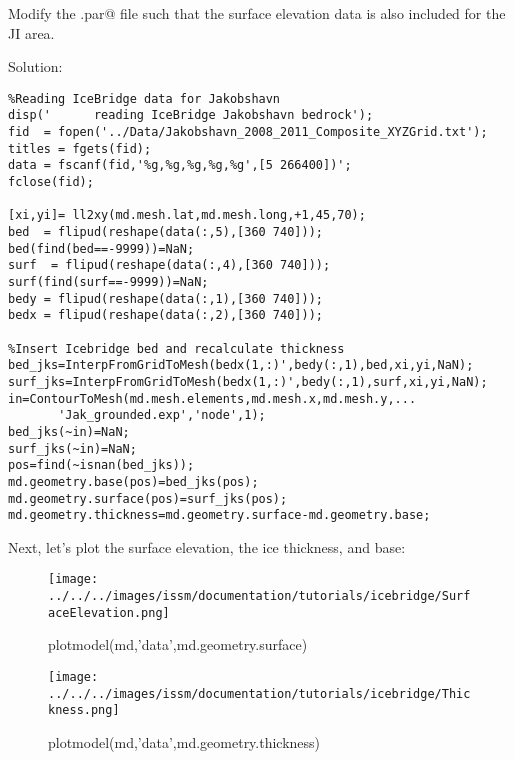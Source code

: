 Modify the \verb@Greenland.par@ file such that the surface elevation data is also included for the JI area.

\vspace{5cm}

Solution:
\begin{verbatim}%Reading IceBridge data for Jakobshavn
disp('      reading IceBridge Jakobshavn bedrock');
fid  = fopen('../Data/Jakobshavn_2008_2011_Composite_XYZGrid.txt');
titles = fgets(fid); 
data = fscanf(fid,'%g,%g,%g,%g,%g',[5 266400])';
fclose(fid);

[xi,yi]= ll2xy(md.mesh.lat,md.mesh.long,+1,45,70);
bed  = flipud(reshape(data(:,5),[360 740])); bed(find(bed==-9999))=NaN;
surf  = flipud(reshape(data(:,4),[360 740])); surf(find(surf==-9999))=NaN;
bedy = flipud(reshape(data(:,1),[360 740]));
bedx = flipud(reshape(data(:,2),[360 740]));

%Insert Icebridge bed and recalculate thickness
bed_jks=InterpFromGridToMesh(bedx(1,:)',bedy(:,1),bed,xi,yi,NaN);
surf_jks=InterpFromGridToMesh(bedx(1,:)',bedy(:,1),surf,xi,yi,NaN);
in=ContourToMesh(md.mesh.elements,md.mesh.x,md.mesh.y,...
	   'Jak_grounded.exp','node',1);
bed_jks(~in)=NaN;
surf_jks(~in)=NaN;
pos=find(~isnan(bed_jks));
md.geometry.base(pos)=bed_jks(pos);
md.geometry.surface(pos)=surf_jks(pos);
md.geometry.thickness=md.geometry.surface-md.geometry.base;\end{verbatim}

Next, let's plot the surface elevation, the ice thickness, and base:
\begin{figure}[H]
	\begin{center}
	\texttt{[image: ../../../images/issm/documentation/tutorials/icebridge/SurfaceElevation.png]}
	\caption{plotmodel(md,'data',md.geometry.surface)}
	\end{center}
\end{figure}

\begin{figure}[H]
	\begin{center}
	\texttt{[image: ../../../images/issm/documentation/tutorials/icebridge/Thickness.png]}
	\caption{plotmodel(md,'data',md.geometry.thickness)}
	\end{center}
\end{figure}

